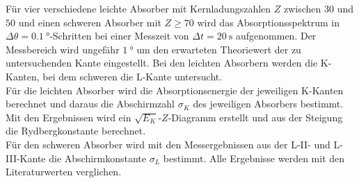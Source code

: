 Für vier verschiedene leichte Absorber mit Kernladungszahlen $Z$ zwischen $30$ und $50$ und einen schweren Absorber mit $Z \geq 70$ wird das Absorptionsspektrum in $\Delta\theta=\SI{0.1}{\degree}$-Schritten bei einer Messzeit von $\Delta t=\SI{20}{\second}$ aufgenommen. Der Messbereich wird ungefähr $\SI{1}{\degree}$ um den erwarteten Theoriewert der zu untersuchenden Kante eingestellt. Bei den leichten Absorbern werden die K-Kanten, bei dem schweren die L-Kante untersucht.\\
Für die leichten Absorber wird die Absorptionsenergie der jeweiligen K-Kanten berechnet und daraus die Abschirmzahl $\sigma_K$ des jeweiligen Absorbers bestimmt. Mit den Ergebnissen wird ein $\sqrt{E_K}$-$Z$-Diagramm erstellt und aus der Steigung die Rydbergkonstante berechnet.\\
Für den schweren Absorber wird mit den Messergebnissen aus der L-II- und L-III-Kante die Abschirmkonstante $\sigma_L$ bestimmt.
Alle Ergebnisse werden mit den Literaturwerten verglichen.